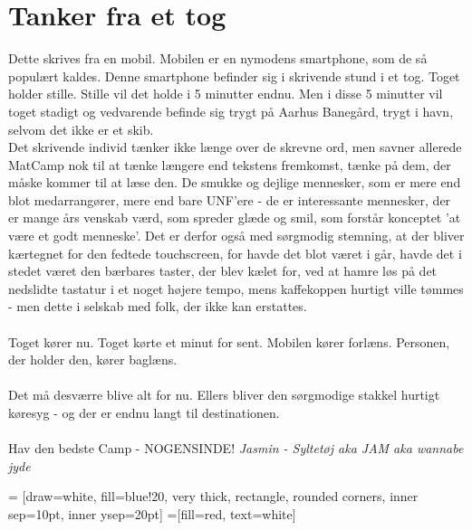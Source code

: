 

\begin{minipage}[b]{0.95\linewidth}
\begin{minipage}[t]{0.47\textwidth}
\vspace{3mm}
\section*{Tanker fra et tog}
Dette skrives fra en mobil. Mobilen er en nymodens smartphone, som de så populært kaldes. Denne smartphone befinder sig i skrivende stund i et tog. Toget holder stille. Stille vil det holde i 5 minutter endnu. Men i disse 5 minutter vil toget stadigt og vedvarende befinde sig trygt på Aarhus Banegård, trygt i havn, selvom det ikke er et skib.\\

Det skrivende individ tænker ikke længe over de skrevne ord, men savner allerede MatCamp nok til at tænke længere end tekstens fremkomst, tænke på dem, der måske kommer til at læse den. De smukke og dejlige mennesker, som er mere end blot medarrangører, mere end bare UNF'ere - de er interessante mennesker, der er mange års venskab værd, som spreder glæde og smil, som forstår konceptet 'at være et godt menneske'. Det er derfor også med sørgmodig stemning, at der bliver kærtegnet for den fedtede touchscreen, for havde det blot været i går, havde det i stedet været den bærbares taster, der blev kælet for, ved at hamre løs på det nedslidte tastatur i et noget højere tempo, mens kaffekoppen hurtigt ville tømmes - men dette i selskab med folk, der ikke kan erstattes. \\
\\
Toget kører nu. Toget kørte et minut for sent. Mobilen kører forlæns. Personen, der holder den, kører baglæns. \\
\\
Det må desværre blive alt for nu. Ellers bliver den sørgmodige stakkel hurtigt køresyg - og der er endnu langt til destinationen.
\\
\\
Hav den bedste Camp - NOGENSINDE!
{\flushright\emph{Jasmin - Syltetøj aka JAM aka wannabe jyde}}

\end{minipage}
\hfill\begin{minipage}[t]{0.47\textwidth}

\vspace{1mm}
 = [draw=white, fill=blue!20, very thick,
    rectangle, rounded corners, inner sep=10pt, inner ysep=20pt]
 =[fill=red, text=white]


\end{minipage}
\end{minipage}
